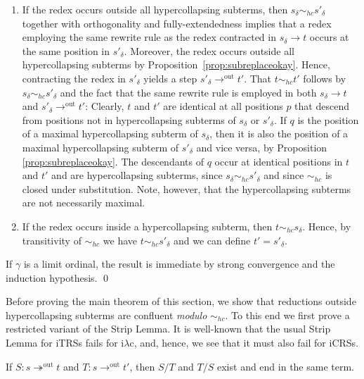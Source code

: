 \documentclass{LMCS}
\theoremstyle{plain}
\theoremstyle{definition}
\newcommand{\rew}{\rightarrow}
\newcommand{\trewt}{\twoheadrightarrow}
\newcommand{\out}{\trewt^\mathrm{out}}
\newcommand{\outs}{\rew^\mathrm{out}}
\newcommand{\simhc}{\sim_{hc}}
\newcommand{\iLC}{i$\lambda$c\xspace}
\begin{document}
\begin{enumerate}[$\bullet$]

\item
If the redex occurs outside all hypercollapsing subterms, then $s_\delta \simhc s'_\delta$ together with orthogonality and fully-extendedness implies that a redex employing the same rewrite rule as the redex contracted in $s_\delta \rew t$ occurs at the same position in $s'_\delta$. Moreover, the redex occurs outside all hypercollapsing subterms by Proposition~\ref{prop:subreplaceokay}. Hence, contracting the redex in $s'_\delta$ yields a step $s'_\delta \outs t'$. That $t \simhc t'$ follows by $s_\delta \simhc s'_\delta$ and the fact that the same rewrite rule is employed in both $s_\delta \rew t$ and $s'_\delta \outs t'$: Clearly, $t$ and $t'$ are identical at all positions $p$ that descend from positions not in hypercollapsing subterms of $s_\delta$ or $s'_\delta$. If $q$ is the position of a maximal hypercollapsing subterm of $s_\delta$, then it is also the position of a maximal hypercollapsing subterm of $s'_\delta$ and vice versa, by Proposition \ref{prop:subreplaceokay}. The descendants of $q$ occur at identical positions in $t$ and $t'$ and are hypercollapsing subterms, since $s_\delta \simhc s'_\delta$ and since $\simhc$ is closed under substitution. Note, however, that the hypercollapsing subterms are not necessarily maximal.

\item
If the redex occurs inside a hypercollapsing subterm, then $t \simhc s_\delta$. Hence, by transitivity of $\simhc$ we have $t \simhc s'_\delta$ and we can define $t' = s'_\delta$.
\end{enumerate}

If $\gamma$ is a limit ordinal, the result is immediate by strong convergence and the induction hypothesis. \qed

Before proving the main theorem of this section, we show that reductions outside hypercollapsing subterms are confluent \emph{modulo} $\simhc$. To this end we first prove a restricted variant of the Strip Lemma. It is well-known that the usual Strip Lemma for iTRSs fails for \iLC \cite{KKSV97}, and, hence, we see that it must also fail for iCRSs.

\begin{lem}
\label{lem:out_strip}
If $S: s \out t$ and $T: s \outs t'$, then $S/T$ and $T/S$ exist and end in the same term.
\end{lem}
\end{document}
